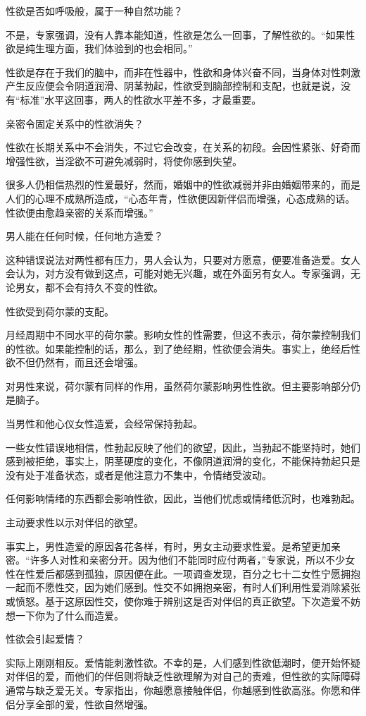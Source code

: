 \documentclass[12pt,UTF8,openany]{ctexbook}
\begin{document}
性欲是否如呼吸般，属于一种自然功能？

不是，专家强调，没有人靠本能知道，性欲是怎么一回事，了解性欲的。“如果性欲是纯生理方面，我们体验到的也会相同。”

性欲是存在于我们的脑中，而非在性器中，性欲和身体兴奋不同，当身体对性刺激产生反应便会令阴道润滑、阴茎勃起，性欲受到脑部控制和支配，也就是说，没有“标准”水平这回事，两人的性欲水平差不多，才最重要。

亲密令固定关系中的性欲消失？

性欲在长期关系中不会消失，不过它会改变，在关系的初段。会因性紧张、好奇而增强性欲，当淫欲不可避免减弱时，将使你感到失望。

很多人仍相信热烈的性爱最好，然而，婚姻中的性欲减弱并非由婚姻带来的，而是人们的心理不成熟所造成，“心态年青，性欲便因新伴侣而增强，心态成熟的话。性欲便由愈趋亲密的关系而增强。”

男人能在任何时候，任何地方造爱？

这种错误说法对两性都有压力，男人会认为，只要对方愿意，便要准备造爱。女人会认为，对方没有做到这点，可能对她无兴趣，或在外面另有女人。专家强调，无论男女，都不会有持久不变的性欲。

性欲受到荷尔蒙的支配。

月经周期中不同水平的荷尔蒙。影响女性的性需要，但这不表示，荷尔蒙控制我们的性欲。如果能控制的话，那么，到了绝经期，性欲便会消失。事实上，绝经后性欲不但仍然有，而且还会增强。

对男性来说，荷尔蒙有同样的作用，虽然荷尔蒙影响男性性欲。但主要影响部分仍是脑子。

当男性和他心仪女性造爱，会经常保持勃起。

一些女性错误地相信，性勃起反映了他们的欲望，因此，当勃起不能坚持时，她们感到被拒绝，事实上，阴茎硬度的变化，不像阴道润滑的变化，不能保持勃起只是没有处于准备状态，或者是他注意力不集中，令情绪受波动。

任何影响情绪的东西都会影响性欲，因此，当他们忧虑或情绪低沉时，也难勃起。

主动要求性以示对伴侣的欲望。

事实上，男性造爱的原因各花各样，有时，男女主动要求性爱。是希望更加亲密。“许多人对性和亲密分开。因为他们不能同时应付两者，”专家说，所以不少女性在性爱后都感到孤独，原因便在此。一项调查发现，百分之七十二女性宁愿拥抱一起而不愿性交，因为她们感到。性交不如拥抱亲密，有时人们利用性爱消除紧张或愤怒。基于这原因性交，使你难于辨别这是否对伴侣的真正欲望。下次造爱不妨想一下你为了什么而造爱。

性欲会引起爱情？

实际上刚刚相反。爱情能刺激性欲。不幸的是，人们感到性欲低潮时，便开始怀疑对伴侣的爱，而他们的伴侣则将缺乏性欲理解为对自己的责难，但性欲的实际障碍通常与缺乏爱无关。专家指出，你越愿意接触伴侣，你越感到性欲高涨。你愿和伴侣分享全部的爱，性欲自然增强。
\end{document}
